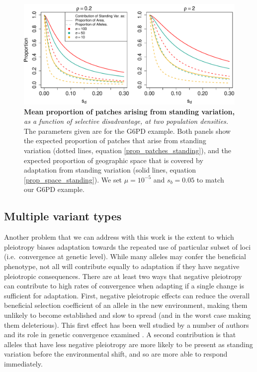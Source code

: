 \documentclass{article}
\newcommand{\plr}[1]{{\it\color{Fuchsia}#1}}
\begin{document}
\begin{figure}[ht]
\begin{center}
  \includegraphics[width=1.0\textwidth]{G6PD_standing_var_proportion}
\caption{ %
{\bf Mean proportion of patches arising from standing variation,} 
\plr{as a function of selective disadvantage, at two population densities.}
The parameters given are for the G6PD example.
Both panels show the expected proportion of patches that
arise from standing variation (dotted lines, equation \eqref{prop_patches_standing}),
and the expected proportion of
geographic space that is covered by adaptation from standing variation
(solid lines, equation \eqref{prop_space_standing}).
We set $\mu=10^{-5}$ and $s_b=0.05$ to match our G6PD example.} \label{G6PD_standing_var_proportion}
\end{center}
\end{figure}




\subsection{Multiple variant types}
Another problem that we can address with this work is
the extent to which pleiotropy biases 
adaptation towards the repeated use of particular subset of loci
(i.e.\ convergence at genetic level). 
While many alleles may confer the beneficial phenotype, 
not all will contribute equally to adaptation if they have negative pleiotropic consequences.
There are at least two ways that negative pleiotropy can contribute to high rates of convergence 
when adapting if a single change is sufficient for adaptation. 
First, negative pleiotropic effects can reduce 
the overall beneficial selection coefficient of an allele in the new environment,
making them unlikely to become established and slow to spread 
(and in the worst case making them deleterious). 
This first effect has been well studied by a number of authors
\citep{Orr:00,Otto:04,WelchWaxman:03,Chevin:10} and its role in genetic
convergence examined \citep{Orr:05,Chevin:10,Unckless:09}. 
A second contribution is that alleles that have
less negative pleiotropy are more likely to be present as standing variation 
before the environmental shift, and so are more able to respond
immediately.
\end{document}
